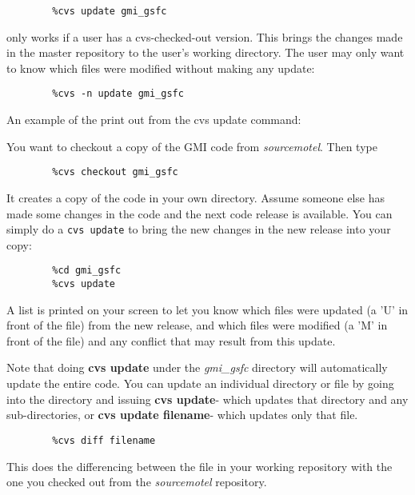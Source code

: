 \begin{verbatim}
        %cvs update gmi_gsfc
\end{verbatim}
%
only works if a user has a cvs-checked-out version.
This brings the changes made in the master repository to the user's working
directory. 
The user may only want to know which files were modified without making any
update:
%
\begin{verbatim}
        %cvs -n update gmi_gsfc
\end{verbatim}
%
An example of the print out from the cvs update command:
%
\begin{example}
You want to checkout a copy of the GMI code from {\em sourcemotel}.
Then type
%
\begin{verbatim}
        %cvs checkout gmi_gsfc
\end{verbatim}
%
It creates a copy of the code in your own directory.
Assume someone else has made some changes in the code and the next code release is available.
You can simply do a {\tt cvs update} to bring the new changes in the new release
into your copy:
%
\begin{verbatim}
        %cd gmi_gsfc
        %cvs update 
\end{verbatim}
%
A list is printed on your screen to let you know which files were updated 
(a 'U' in front of the file) from the new release, and which files were modified 
(a 'M' in front of the file) and any conflict that may result from this update.
\end{example}

\begin{remark}
Note that doing {\bf cvs update} under the {\em gmi\_gsfc} directory will automatically
update the entire code. You can update an individual directory or file by going into
the directory and issuing {\bf cvs update}- which updates that directory and any
sub-directories, or {\bf cvs update filename}- which updates only that file.
\end{remark}

\begin{verbatim}
        %cvs diff filename
\end{verbatim}

This does the differencing between the file in your working repository with the one
you checked out from the {\em sourcemotel} repository.

